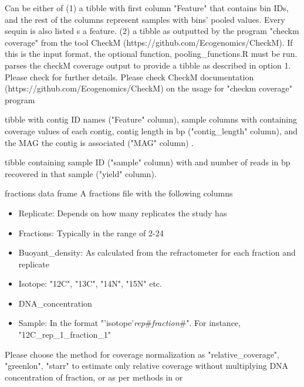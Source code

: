 \documentclass[a4paper]{book}
\begin{document}
\begin{Arguments}
\begin{ldescription}
\item[\code{f\_tibble}] Can be either of
(1) a tibble with first column "Feature" that contains bin IDs, and the rest of the columns represent samples with bins' pooled values. Every sequin is also listed s a feature.
(2) a tibble as outputted by the program "checkm coverage" from the tool CheckM (https://github.com/Ecogenomics/CheckM). If this is the input format, the optional function, pooling\_functions.R must be run.  parses the checkM coverage output to provide a tibble as described in option 1. Please check  for further details. Please check CheckM documentation (https://github.com/Ecogenomics/CheckM) on the usage for "checkm coverage" program

\item[\code{contig\_coverage}] tibble with contig ID names ("Feature" column), sample columns with  containing coverage values of each contig, contig length in bp ("contig\_length" column), and the MAG the contig is associated ("MAG" column) .

\item[\code{sequencing\_yield}] tibble containing sample ID ("sample" column) with  and number of reads in bp recovered in that sample ("yield" column).

\item[\code{fractions\_df}] fractions data frame
A fractions file with the following columns
\begin{itemize}

\item{} Replicate: Depends on how many replicates the study has
\item{} Fractions: Typically in the range of 2-24
\item{} Buoyant\_density: As calculated from the refractometer for each fraction and replicate
\item{} Isotope: "12C", "13C", "14N", "15N" etc.
\item{} DNA\_concentration
\item{} Sample: In the format "'isotope'\emph{rep}\#\emph{fraction}\#".
For instance, "12C\_rep\_1\_fraction\_1"

\end{itemize}


\item[\code{approach}] Please choose the method for coverage normalization as "relative\_coverage", "greenlon", "starr" to estimate only relative coverage without multiplying DNA concentration of fraction, or as per methods in  or 
\end{ldescription}
\end{Arguments}
\end{document}
